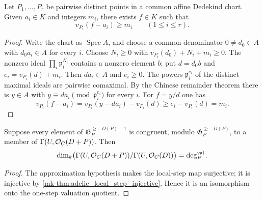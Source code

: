 \begin{theorem}
  \label{mk-thm:adelic_weak_approximation}
  Let \(P_1,\ldots,P_r\) be pairwise distinct points in a common affine
  Dedekind chart.  Given \(a_i\in K\) and integers \(m_i\), there exists
  \(f\in K\) such that
  \[
    v_{P_i}(f-a_i)\geq m_i\qquad(1\leq i\leq r).
  \]
\end{theorem}
\begin{proof}
  Write the chart as \(\operatorname{Spec}A\), and choose a common
  denominator \(0\ne d_0\in A\) with \(d_0a_i\in A\) for every \(i\).
  Choose \(N_i\geq0\) with
  \(v_{P_i}(d_0)+N_i+m_i\geq0\).  The nonzero ideal
  \(\prod_i\mathfrak p_i^{N_i}\) contains a nonzero element \(b\); put
  \(d=d_0b\) and \(e_i=v_{P_i}(d)+m_i\).  Then \(da_i\in A\) and
  \(e_i\geq0\).  The powers
  \(\mathfrak p_i^{e_i}\) of the distinct maximal ideals are pairwise
  comaximal.  By the Chinese remainder theorem there is \(y\in A\) with
  \(y\equiv da_i\pmod{\mathfrak p_i^{e_i}}\) for every \(i\).  For
  \(f=y/d\) one has
  \[
    v_{P_i}(f-a_i)=v_{P_i}(y-da_i)-v_{P_i}(d)
      \geq e_i-v_{P_i}(d)=m_i.
  \]
\end{proof}

\begin{theorem}
  \label{mk-thm:adelic_local_step_dim_eq_residue_degree}
  \leanok

  Suppose every element of \(\mathfrak G_P^{\ge-D(P)-1}\) is congruent,
  modulo \(\mathfrak G_P^{\ge-D(P)}\), to a member of
  \(\Gamma(U,\mathcal{O}_{C}(D+P))\).  Then
  \[
    \dim_k\bigl(\Gamma(U,\mathcal{O}_{C}(D+P))/\Gamma(U,\mathcal{O}_{C}(D))\bigr)
      =\deg_P^{\mathrm{val}}.
  \]
\end{theorem}
\begin{proof}
  \leanok
  The approximation hypothesis makes the local-step map surjective; it is
  injective by \ref{mk-thm:adelic_local_step_injective}.  Hence it is an
  isomorphism onto the one-step valuation quotient.
\end{proof}


